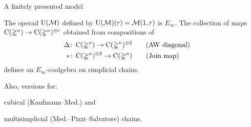 \begin{frame}{A finitely presented model}
	\begin{theorem}[Med.]
		The operad $\operatorname{\operatorname{U}(\mathcal{M})}$ defined by $\operatorname{\operatorname{U}(\mathcal{M})}(r) = \operatorname{\mathcal{M}}(1,r)$ is $E_\infty$.
		\medskip\pause
		The collection of maps $\operatorname{C}(\mathbb{\Delta}^n) \to \operatorname{C}(\mathbb{\Delta}^n)^{\otimes r}$ obtained from compositions of
		\begin{align*}
			\Delta &\colon \operatorname{C}(\mathbb{\Delta}^n) \to \operatorname{C}(\mathbb{\Delta}^n)^{\otimes 2}
			\qquad \text{(AW diagonal)} \\
			\ast &\colon \operatorname{C}(\mathbb{\Delta}^n)^{\otimes 2} \to \operatorname{C}(\mathbb{\Delta}^n)
			\qquad \text{(Join map)}
		\end{align*}
		defines an $E_\infty$-coalgebra on simplicial chains.
	\end{theorem}

	\pause

	\qquad \qquad \scalebox{0.7}{}

	\medskip\pause

	Also, versions for: \par
		\qquad \textcolor{pblue}{cubical} (Kaufmann--Med.) and \par
		\qquad \textcolor{pblue}{multisimplicial} (Med.--Pizzi--Salvatore) chains.

\end{frame}

